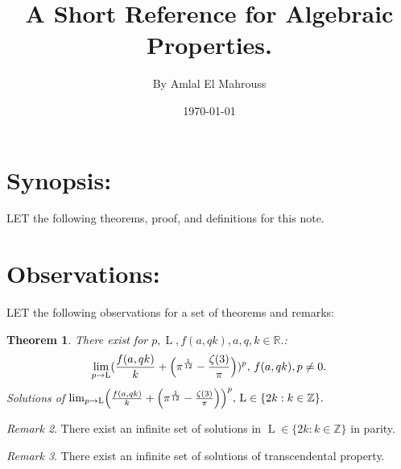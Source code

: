 \documentclass[10pt]{article}
\title{%
	\vspace{-1.5em}%
	\large\textbf{A Short Reference for Algebraic Properties.}%
}
\author{By Amlal El Mahrouss}
\date{\today}
\theoremstyle{plain}
\newtheorem{theorem}{Theorem}[section]
\theoremstyle{definition}
\theoremstyle{remark}
\newtheorem{remark}[theorem]{Remark}
\begin{document}

\maketitle
\tableofcontents
\newpage

\section{Synopsis:}

\lettrine[lines=1, lhang=0.1, loversize=0.2]{L}ET the following theorems, proof, and definitions for this note.

\section{Observations:}

\lettrine[lines=1, lhang=0.1, loversize=0.2]{L}ET the following observations for a set of theorems and remarks:

\begin{theorem}
	There exist for $p, \operatorname{L}, f(a, qk), a, q, k \in \mathbb{R}.$:
	\begin{equation}
		\lim_{p \to \operatorname{L}} (\frac{f(a, qk)}{k} + \Bigl(\pi^{\frac{1}{12}} - \frac{\zeta(3)}{\pi}\Bigr))^p, \, f(a, qk), p \neq 0.
	\end{equation}
	Solutions of $\lim_{p \to \operatorname{L}} \Bigl(\frac{f(a, qk)}{k} + \Bigl(\pi^{\frac{1}{12}} - \frac{\zeta(3)}{\pi}\Bigr)\Bigr)^p, \, \operatorname{L} \in \{2k : k \in \mathbb{Z}\}.$
\end{theorem}
\begin{remark}
	There exist an infinite set of solutions in $\operatorname{L} \in \{2k : k \in \mathbb{Z}\}$ in parity.
\end{remark}
\begin{remark}
There exist an infinite set of solutions of transcendental property.
\end{remark}
\end{document}

